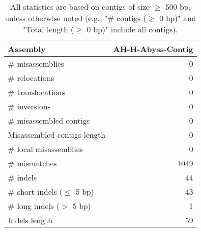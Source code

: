 \documentclass[12pt,a4paper]{article}
\begin{document}
\begin{table}[ht]
\begin{center}
\caption{All statistics are based on contigs of size $\geq$ 500 bp, unless otherwise noted (e.g., "\# contigs ($\geq$ 0 bp)" and "Total length ($\geq$ 0 bp)" include all contigs).}
\begin{tabular}{|l*{1}{|r}|}
\hline
Assembly & AH-H-Abyss-Contig \\ \hline
\# misassemblies & 0 \\ \hline
\hspace{5mm}\# relocations & 0 \\ \hline
\hspace{5mm}\# translocations & 0 \\ \hline
\hspace{5mm}\# inversions & 0 \\ \hline
\# misassembled contigs & 0 \\ \hline
Misassembled contigs length & 0 \\ \hline
\# local misassemblies & 0 \\ \hline
\# mismatches & 1049 \\ \hline
\# indels & 44 \\ \hline
\hspace{5mm}\# short indels ($\leq$ 5 bp) & 43 \\ \hline
\hspace{5mm}\# long indels ($>$ 5 bp) & 1 \\ \hline
Indels length & 59 \\ \hline
\end{tabular}
\end{center}
\end{table}
\end{document}
